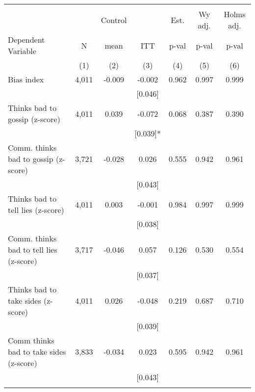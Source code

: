 \begin{tabular}{lcccccc}
\hline \noalign{\smallskip} &  &  &  &  &  & \\
 &  & Control &  & Est. & Wy adj. & Holms adj.\\
Dependent Variable & N & mean & ITT & p-val & p-val & p-val\\
 & (1) & (2) & (3) & (4) & (5) & (6)\\
\noalign{\smallskip}\hline \noalign{\smallskip}Bias index & 4,011 & -0.009 & -0.002 & 0.962 & 0.997 & 0.999\\
 &  &  & [0.046] &  &  & \\
\quad Thinks bad to gossip (z-score) & 4,011 & 0.039 & -0.072 & 0.068 & 0.387 & 0.390\\
 &  &  & [0.039]* &  &  & \\
\quad Comm. thinks bad to gossip (z-score) & 3,721 & -0.028 & 0.026 & 0.555 & 0.942 & 0.961\\
 &  &  & [0.043] &  &  & \\
\quad Thinks bad to tell lies (z-score) & 4,011 & 0.003 & -0.001 & 0.984 & 0.997 & 0.999\\
 &  &  & [0.038] &  &  & \\
\quad Comm. thinks bad to tell lies (z-score) & 3,717 & -0.046 & 0.057 & 0.126 & 0.530 & 0.554\\
 &  &  & [0.037] &  &  & \\
\quad Thinks bad to take sides (z-score) & 4,011 & 0.026 & -0.048 & 0.219 & 0.687 & 0.710\\
 &  &  & [0.039] &  &  & \\
\quad Comm thinks bad to take sides (z-score) & 3,833 & -0.034 & 0.023 & 0.595 & 0.942 & 0.961\\
 &  &  & [0.043] &  &  & \\
\noalign{\smallskip}\hline\end{tabular}
